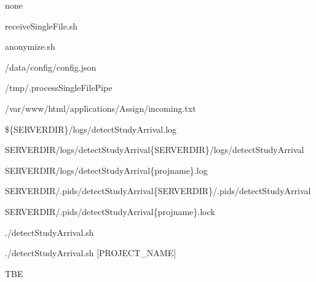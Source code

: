 \documentclass[letterpaper,10pt,english]{sphinxmanual}
\begin{document}
\begin{DUlineblock}{0em}
\item[] \sphinxhyphen{}  none
\item[] \sphinxhyphen{} 
\item[]
\begin{DUlineblock}{\DUlineblockindent}
\item[] \sphinxhyphen{} receiveSingleFile.sh
\item[] \sphinxhyphen{} anonymize.sh
\item[] \sphinxhyphen{} /data/config/config.json
\item[] \sphinxhyphen{} /tmp/.processSingleFilePipe
\item[] \sphinxhyphen{} /var/www/html/applications/Assign/incoming.txt
\end{DUlineblock}
\item[] \sphinxhyphen{} 
\item[]
\begin{DUlineblock}{\DUlineblockindent}
\item[] \sphinxhyphen{} \$\{SERVERDIR\}/logs/detectStudyArrival.log
\item[] \sphinxhyphen{} SERVERDIR/logs/detectStudyArrival\{SERVERDIR\}/logs/detectStudyArrival
\item[] \sphinxhyphen{} SERVERDIR/logs/detectStudyArrival\{projname\}.log
\end{DUlineblock}
\item[] \sphinxhyphen{} 
\item[]
\begin{DUlineblock}{\DUlineblockindent}
\item[] \sphinxhyphen{} SERVERDIR/.pids/detectStudyArrival\{SERVERDIR\}/.pids/detectStudyArrival
\item[] \sphinxhyphen{} SERVERDIR/.pids/detectStudyArrival\{projname\}.lock
\end{DUlineblock}
\item[] \sphinxhyphen{} 
\item[]
\begin{DUlineblock}{\DUlineblockindent}
\item[] \sphinxhyphen{} ./detectStudyArrival.sh
\item[] \sphinxhyphen{} ./detectStudyArrival.sh {[}PROJECT\_NAME{]}
\end{DUlineblock}
\item[] \sphinxhyphen{}  TBE
\end{DUlineblock}
\end{document}
